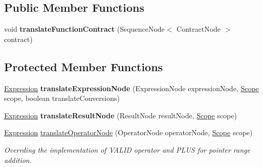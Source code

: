 \subsection*{Public Member Functions}
\begin{DoxyCompactItemize}
\item 
\hypertarget{classedu_1_1udel_1_1cis_1_1vsl_1_1civl_1_1model_1_1common_1_1ContractTranslator_af1d3a29c257acfbf6dcd21aaff957b34}{}void {\bfseries translate\+Function\+Contract} (Sequence\+Node$<$ Contract\+Node $>$ contract)\label{classedu_1_1udel_1_1cis_1_1vsl_1_1civl_1_1model_1_1common_1_1ContractTranslator_af1d3a29c257acfbf6dcd21aaff957b34}

\end{DoxyCompactItemize}
\subsection*{Protected Member Functions}
\begin{DoxyCompactItemize}
\item 
\hypertarget{classedu_1_1udel_1_1cis_1_1vsl_1_1civl_1_1model_1_1common_1_1ContractTranslator_af571c4f964abf7abdd3c8d81eb8d5a6b}{}\hyperlink{interfaceedu_1_1udel_1_1cis_1_1vsl_1_1civl_1_1model_1_1IF_1_1expression_1_1Expression}{Expression} {\bfseries translate\+Expression\+Node} (Expression\+Node expression\+Node, \hyperlink{interfaceedu_1_1udel_1_1cis_1_1vsl_1_1civl_1_1model_1_1IF_1_1Scope}{Scope} scope, boolean translate\+Conversions)\label{classedu_1_1udel_1_1cis_1_1vsl_1_1civl_1_1model_1_1common_1_1ContractTranslator_af571c4f964abf7abdd3c8d81eb8d5a6b}

\item 
\hypertarget{classedu_1_1udel_1_1cis_1_1vsl_1_1civl_1_1model_1_1common_1_1ContractTranslator_a2b803e03eab11d3b2d00b05024adb9b1}{}\hyperlink{interfaceedu_1_1udel_1_1cis_1_1vsl_1_1civl_1_1model_1_1IF_1_1expression_1_1Expression}{Expression} {\bfseries translate\+Result\+Node} (Result\+Node result\+Node, \hyperlink{interfaceedu_1_1udel_1_1cis_1_1vsl_1_1civl_1_1model_1_1IF_1_1Scope}{Scope} scope)\label{classedu_1_1udel_1_1cis_1_1vsl_1_1civl_1_1model_1_1common_1_1ContractTranslator_a2b803e03eab11d3b2d00b05024adb9b1}

\item 
\hyperlink{interfaceedu_1_1udel_1_1cis_1_1vsl_1_1civl_1_1model_1_1IF_1_1expression_1_1Expression}{Expression} \hyperlink{classedu_1_1udel_1_1cis_1_1vsl_1_1civl_1_1model_1_1common_1_1ContractTranslator_aa023283110232fd784fd05826accaf90}{translate\+Operator\+Node} (Operator\+Node operator\+Node, \hyperlink{interfaceedu_1_1udel_1_1cis_1_1vsl_1_1civl_1_1model_1_1IF_1_1Scope}{Scope} scope)
\begin{DoxyCompactList}\small\item\em Overrding the implementation of V\+A\+L\+I\+D operator and P\+L\+U\+S for pointer range addition. \end{DoxyCompactList}\end{DoxyCompactItemize}


